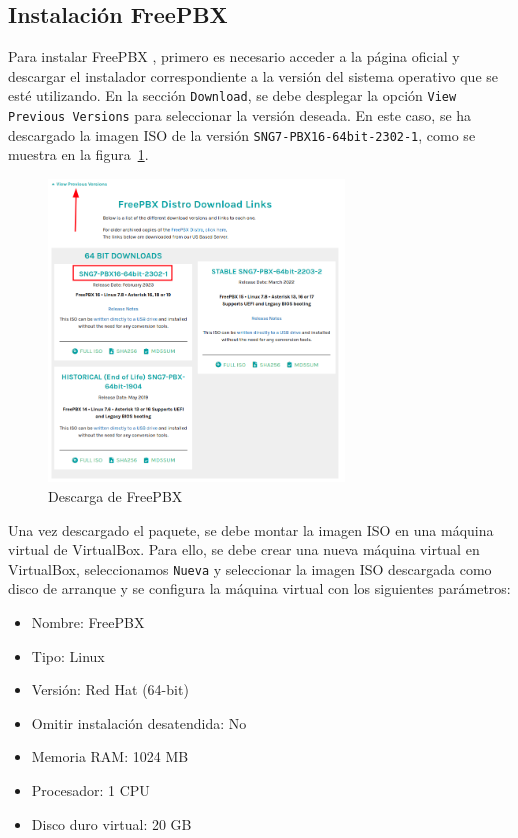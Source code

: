 \subsection{Instalación FreePBX}
\label{Apendice1:instalacion_freepbx}
Para instalar FreePBX \cite{freepbx}, primero es necesario acceder a la página oficial y descargar el instalador correspondiente a la versión del sistema operativo que se esté utilizando. En la sección \texttt{Download}, se debe desplegar la opción \texttt{View Previous Versions} para seleccionar la versión deseada. En este caso, se ha descargado la imagen ISO de la versión \texttt{SNG7-PBX16-64bit-2302-1}, como se muestra en la figura~\ref{fig:freepbx_download}.
\begin{figure}[H]
	\centering
	\includegraphics[width=0.7\textwidth]{images/freepbx_download.png}
	\caption{Descarga de FreePBX}
	\label{fig:freepbx_download}
\end{figure}

\vspace{1em}
\noindent
Una vez descargado el paquete, se debe montar la imagen ISO en una máquina virtual de VirtualBox.
Para ello, se debe crear una nueva máquina virtual en VirtualBox, seleccionamos \texttt{Nueva} 
y seleccionar la imagen ISO descargada como disco de arranque y se configura la máquina virtual con los siguientes parámetros:
\begin{multicols}{2}
\begin{itemize}
    \item Nombre: FreePBX
    \item Tipo: Linux
    \item Versión: Red Hat (64-bit)
		\item Omitir instalación desatendida: No
    \item Memoria RAM: 1024 MB
    \item Procesador: 1 CPU
		\item Disco duro virtual: 20 GB 
\end{itemize}
\end{multicols}

